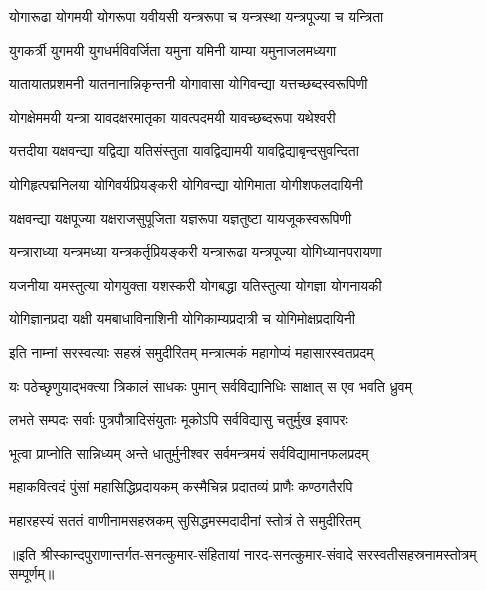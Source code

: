 \twolineshloka
{योगारूढा योगमयी योगरूपा यवीयसी}
{यन्त्ररूपा च यन्त्रस्था यन्त्रपूज्या च यन्त्रिता}%

\twolineshloka
{युगकर्त्री युगमयी युगधर्मविवर्जिता}
{यमुना यमिनी याम्या यमुनाजलमध्यगा}%

\twolineshloka
{यातायातप्रशमनी यातनानान्निकृन्तनी}
{योगावासा योगिवन्द्या यत्तच्छब्दस्वरूपिणी}%

\twolineshloka
{योगक्षेममयी यन्त्रा यावदक्षरमातृका}
{यावत्पदमयी यावच्छब्दरूपा यथेश्वरी}%

\twolineshloka
{यत्तदीया यक्षवन्द्या यद्विद्या यतिसंस्तुता}
{यावद्विद्यामयी यावद्विद्याबृन्दसुवन्दिता}%

\twolineshloka
{योगिहृत्पद्मनिलया योगिवर्यप्रियङ्करी}
{योगिवन्द्या योगिमाता योगीशफलदायिनी}%

\twolineshloka
{यक्षवन्द्या यक्षपूज्या यक्षराजसुपूजिता}
{यज्ञरूपा यज्ञतुष्टा यायजूकस्वरूपिणी}%

\twolineshloka
{यन्त्राराध्या यन्त्रमध्या यन्त्रकर्तृप्रियङ्करी}
{यन्त्रारूढा यन्त्रपूज्या योगिध्यानपरायणा}%

\twolineshloka
{यजनीया यमस्तुत्या योगयुक्ता यशस्करी}
{योगबद्धा यतिस्तुत्या योगज्ञा योगनायकी}%

\twolineshloka
{योगिज्ञानप्रदा यक्षी यमबाधाविनाशिनी}
{योगिकाम्यप्रदात्री च योगिमोक्षप्रदायिनी}%


 \resetShloka

\twolineshloka
{इति नाम्नां सरस्वत्याः सहस्रं समुदीरितम्}
{मन्त्रात्मकं महागोप्यं महासारस्वतप्रदम्}%

\twolineshloka
{यः पठेच्छृणुयाद्भक्त्या त्रिकालं साधकः पुमान्}
{सर्वविद्यानिधिः साक्षात् स एव भवति ध्रुवम्}%

\twolineshloka
{लभते सम्पदः सर्वाः पुत्रपौत्रादिसंयुताः}
{मूकोऽपि सर्वविद्यासु चतुर्मुख इवापरः}%

\twolineshloka
{भूत्वा प्राप्नोति सान्निध्यम् अन्ते धातुर्मुनीश्वर}
{सर्वमन्त्रमयं सर्वविद्यामानफलप्रदम्}%

\twolineshloka
{महाकवित्वदं पुंसां महासिद्धिप्रदायकम्}
{कस्मैचिन्न प्रदातव्यं प्राणैः कण्ठगतैरपि}%

\twolineshloka
{महारहस्यं सततं वाणीनामसहस्रकम्}
{सुसिद्धमस्मदादीनां स्तोत्रं ते समुदीरितम्}%


॥इति श्रीस्कान्दपुराणान्तर्गत-सनत्कुमार-संहितायां नारद-सनत्कुमार-संवादे सरस्वतीसहस्रनामस्तोत्रम् सम्पूर्णम्॥
